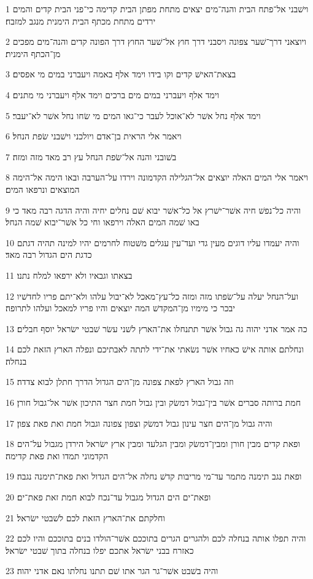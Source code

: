 \par 1 וישׁבני אל־פתח הבית והנה־מים יצאים מתחת מפתן הבית קדימה כי־פני הבית קדים והמים ירדים מתחת מכתף הבית הימנית מנגב למזבח׃
\par 2 ויוצאני דרך־שׁער צפונה ויסבני דרך חוץ אל־שׁער החוץ דרך הפונה קדים והנה־מים מפכים מן־הכתף הימנית׃
\par 3 בצאת־האישׁ קדים וקו בידו וימד אלף באמה ויעברני במים מי אפסים׃
\par 4 וימד אלף ויעברני במים מים ברכים וימד אלף ויעברני מי מתנים׃
\par 5 וימד אלף נחל אשׁר לא־אוכל לעבר כי־גאו המים מי שׂחו נחל אשׁר לא־יעבר׃
\par 6 ויאמר אלי הראית בן־אדם ויולכני וישׁבני שׂפת הנחל׃
\par 7 בשׁובני והנה אל־שׂפת הנחל עץ רב מאד מזה ומזה׃
\par 8 ויאמר אלי המים האלה יוצאים אל־הגלילה הקדמונה וירדו על־הערבה ובאו הימה אל־הימה המוצאים ונרפאו המים׃
\par 9 והיה כל־נפשׁ חיה אשׁר־ישׁרץ אל כל־אשׁר יבוא שׁם נחלים יחיה והיה הדגה רבה מאד כי באו שׁמה המים האלה וירפאו וחי כל אשׁר־יבוא שׁמה הנחל׃
\par 10 והיה יעמדו עליו דוגים מעין גדי ועד־עין עגלים משׁטוח לחרמים יהיו למינה תהיה דגתם כדגת הים הגדול רבה מאד׃
\par 11 בצאתו וגבאיו ולא ירפאו למלח נתנו׃
\par 12 ועל־הנחל יעלה על־שׂפתו מזה ומזה כל־עץ־מאכל לא־יבול עלהו ולא־יתם פריו לחדשׁיו יבכר כי מימיו מן־המקדשׁ המה יוצאים והיו פריו למאכל ועלהו לתרופה׃
\par 13 כה אמר אדני יהוה גה גבול אשׁר תתנחלו את־הארץ לשׁני עשׂר שׁבטי ישׂראל יוסף חבלים׃
\par 14 ונחלתם אותה אישׁ כאחיו אשׁר נשׂאתי את־ידי לתתה לאבתיכם ונפלה הארץ הזאת לכם בנחלה׃
\par 15 וזה גבול הארץ לפאת צפונה מן־הים הגדול הדרך חתלן לבוא צדדה׃
\par 16 חמת ברותה סברים אשׁר בין־גבול דמשׂק ובין גבול חמת חצר התיכון אשׁר אל־גבול חורן׃
\par 17 והיה גבול מן־הים חצר עינון גבול דמשׂק וצפון צפונה וגבול חמת ואת פאת צפון׃
\par 18 ופאת קדים מבין חורן ומבין־דמשׂק ומבין הגלעד ומבין ארץ ישׂראל הירדן מגבול על־הים הקדמוני תמדו ואת פאת קדימה׃
\par 19 ופאת נגב תימנה מתמר עד־מי מריבות קדשׁ נחלה אל־הים הגדול ואת פאת־תימנה נגבה׃
\par 20 ופאת־ים הים הגדול מגבול עד־נכח לבוא חמת זאת פאת־ים׃
\par 21 וחלקתם את־הארץ הזאת לכם לשׁבטי ישׂראל׃
\par 22 והיה תפלו אותה בנחלה לכם ולהגרים הגרים בתוככם אשׁר־הולדו בנים בתוככם והיו לכם כאזרח בבני ישׂראל אתכם יפלו בנחלה בתוך שׁבטי ישׂראל׃
\par 23 והיה בשׁבט אשׁר־גר הגר אתו שׁם תתנו נחלתו נאם אדני יהוה׃

